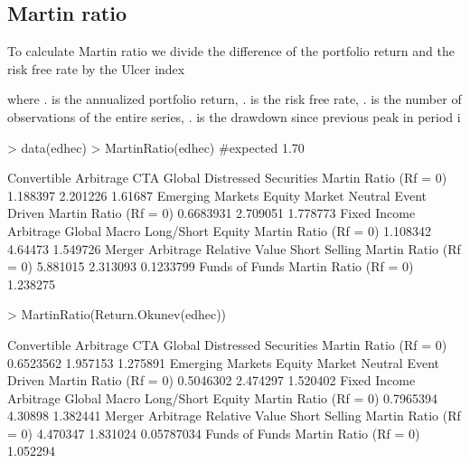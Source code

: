 \documentclass[12pt,letterpaper,english]{article}
\begin{document}
\subsection{Martin ratio}

To calculate Martin ratio we divide the difference of the portfolio return and the risk free rate by the Ulcer index


where . is the annualized portfolio return, . is the risk free rate, . is the number of observations of the entire series, . is the drawdown since previous peak in period i

\begin{Schunk}
\begin{Sinput}
> data(edhec)
> MartinRatio(edhec) #expected 1.70
\end{Sinput}
\begin{Soutput}
                      Convertible Arbitrage CTA Global Distressed Securities
Martin Ratio (Rf = 0)              1.188397   2.201226               1.61687
                      Emerging Markets Equity Market Neutral Event Driven
Martin Ratio (Rf = 0)        0.6683931              2.709051     1.778773
                      Fixed Income Arbitrage Global Macro Long/Short Equity
Martin Ratio (Rf = 0)               1.108342      4.64473          1.549726
                      Merger Arbitrage Relative Value Short Selling
Martin Ratio (Rf = 0)         5.881015       2.313093     0.1233799
                      Funds of Funds
Martin Ratio (Rf = 0)       1.238275
\end{Soutput}
\begin{Sinput}
> MartinRatio(Return.Okunev(edhec))
\end{Sinput}
\begin{Soutput}
                      Convertible Arbitrage CTA Global Distressed Securities
Martin Ratio (Rf = 0)             0.6523562   1.957153              1.275891
                      Emerging Markets Equity Market Neutral Event Driven
Martin Ratio (Rf = 0)        0.5046302              2.474297     1.520402
                      Fixed Income Arbitrage Global Macro Long/Short Equity
Martin Ratio (Rf = 0)              0.7965394      4.30898          1.382441
                      Merger Arbitrage Relative Value Short Selling
Martin Ratio (Rf = 0)         4.470347       1.831024    0.05787034
                      Funds of Funds
Martin Ratio (Rf = 0)       1.052294
\end{Soutput}
\end{Schunk}
\end{document}
